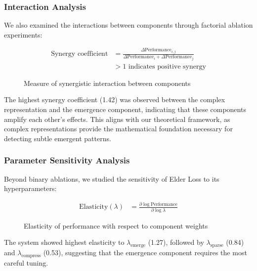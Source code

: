 \subsubsection{Interaction Analysis}

We also examined the interactions between components through factorial ablation experiments:

\begin{figure}[h]
\centering
\begin{minipage}{0.9\textwidth}
\centering
\begin{align}
\text{Synergy coefficient} &= \frac{\Delta\text{Performance}_{i,j}}{\Delta\text{Performance}_i + \Delta\text{Performance}_j}\\
&> 1 \text{ indicates positive synergy}
\end{align}
\end{minipage}
\caption{Measure of synergistic interaction between components}
\end{figure}

The highest synergy coefficient (1.42) was observed between the complex representation and the emergence component, indicating that these components amplify each other's effects. This aligns with our theoretical framework, as complex representations provide the mathematical foundation necessary for detecting subtle emergent patterns.

\subsubsection{Parameter Sensitivity Analysis}

Beyond binary ablations, we studied the sensitivity of Elder Loss to its hyperparameters:

\begin{figure}[h]
\centering
\begin{minipage}{0.9\textwidth}
\centering
\begin{align}
\text{Elasticity}(\lambda) &= \frac{\partial \log \text{Performance}}{\partial \log \lambda}
\end{align}
\end{minipage}
\caption{Elasticity of performance with respect to component weights}
\end{figure}

The system showed highest elasticity to $\lambda_{\text{emerge}}$ (1.27), followed by $\lambda_{\text{sparse}}$ (0.84) and $\lambda_{\text{compress}}$ (0.53), suggesting that the emergence component requires the most careful tuning.

